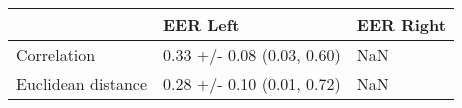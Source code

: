 \begin{tabular}{lll}
\toprule
{} &                    EER Left & EER Right \\
\midrule
Correlation        &  0.33 +/- 0.08 (0.03, 0.60) &       NaN \\
Euclidean distance &  0.28 +/- 0.10 (0.01, 0.72) &       NaN \\
\bottomrule
\end{tabular}
